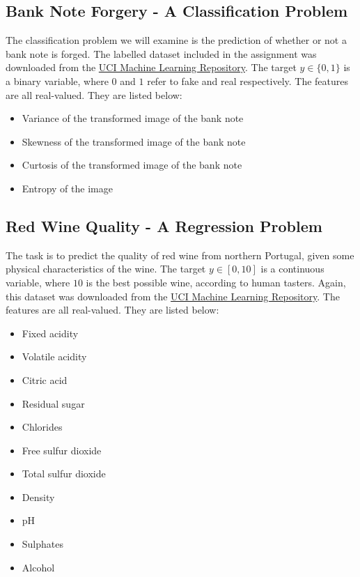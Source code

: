 \documentclass[12pt]{article}
\begin{document}
\subsection{Bank Note Forgery - A Classification Problem}

The classification problem we will examine is the prediction of whether or not a bank note is forged. The labelled dataset included in the assignment was downloaded from the \href{https://archive.ics.uci.edu/ml/datasets/banknote+authentication}{UCI Machine Learning Repository}. The target $y \in \{0, 1\}$ is a binary variable, where $0$ and $1$ refer to fake and real respectively. The features are all real-valued. They are listed below:

\begin{itemize}
    \setlength\itemsep{1px}
    \item Variance of the transformed image of the bank note
    \item Skewness of the transformed image of the bank note
    \item Curtosis of the transformed image of the bank note
    \item Entropy of the image
\end{itemize}

\subsection{Red Wine Quality - A Regression Problem}

The task is to predict the quality of red wine from northern Portugal, given some physical characteristics of the wine. The target $y \in [0, 10]$ is a continuous variable, where $10$ is the best possible wine, according to human tasters. Again, this dataset was downloaded from the \href{https://archive.ics.uci.edu/ml/datasets/banknote+authentication}{UCI Machine Learning Repository}. The features are all real-valued. They are listed below:

\begin{multicols}{3}
\begin{itemize}
    \setlength\itemsep{1px}
    \item Fixed acidity
    \item Volatile acidity
    \item Citric acid
    \item Residual sugar
    \item Chlorides
    \item Free sulfur dioxide
    \item Total sulfur dioxide
    \item Density
    \item pH
    \item Sulphates
    \item Alcohol
\end{itemize}
\end{multicols}
\end{document}
